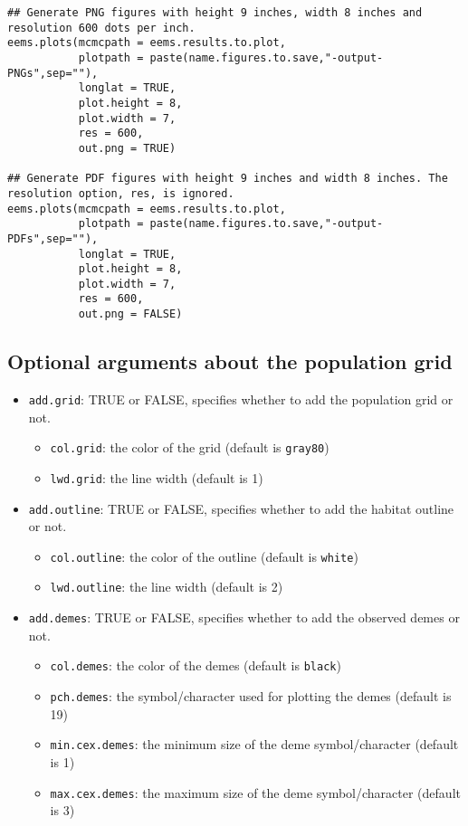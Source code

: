 \documentclass[a4paper,10pt,DIV=15,titlepage,mpinclude=true]{scrartcl}
\newcommand{\keystring}[1]{{\tt #1}}
\begin{document}
\begin{lstlisting}[style=Rcode]
## Generate PNG figures with height 9 inches, width 8 inches and resolution 600 dots per inch.
eems.plots(mcmcpath = eems.results.to.plot,
           plotpath = paste(name.figures.to.save,"-output-PNGs",sep=""),
           longlat = TRUE,
           plot.height = 8,
           plot.width = 7,
           res = 600,
           out.png = TRUE)

## Generate PDF figures with height 9 inches and width 8 inches. The resolution option, res, is ignored.
eems.plots(mcmcpath = eems.results.to.plot,
           plotpath = paste(name.figures.to.save,"-output-PDFs",sep=""),
           longlat = TRUE,
           plot.height = 8,
           plot.width = 7,
           res = 600,
           out.png = FALSE)
\end{lstlisting}

\subsection{Optional arguments about the population grid}

\begin{itemize}
  \item \keystring{add.grid}: TRUE or FALSE, specifies whether to add the population grid or not.
  \begin{itemize}
    \item \keystring{col.grid}: the color of the grid (default is \keystring{gray80})
    \item \keystring{lwd.grid}: the line width (default is 1)
  \end{itemize}
  \item \keystring{add.outline}: TRUE or FALSE, specifies whether to add the habitat outline or not.
  \begin{itemize}
    \item \keystring{col.outline}: the color of the outline (default is \keystring{white})
    \item \keystring{lwd.outline}: the line width (default is 2)
  \end{itemize}
  \item \keystring{add.demes}: TRUE or FALSE, specifies whether to add the observed demes or not. 
  \begin{itemize}
    \item \keystring{col.demes}: the color of the demes (default is \keystring{black})
    \item \keystring{pch.demes}: the symbol/character used for plotting the demes (default is 19)
    \item \keystring{min.cex.demes}: the minimum size of the deme symbol/character (default is 1)
    \item \keystring{max.cex.demes}: the maximum size of the deme symbol/character (default is 3)
  \end{itemize}
\end{itemize}
\end{document}
